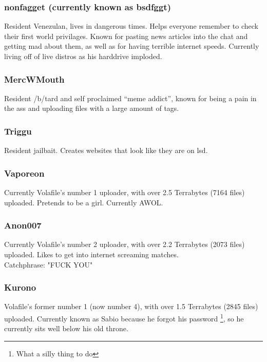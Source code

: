 \documentclass[12pt]{report}
\begin{document}
{{        \subsubsection{nonfagget (currently known as bsdfggt)}
        Resident Venezulan, lives in dangerous times. Helps everyone
        remember to check their first world privilages. Known for
        pasting news articles into the chat and getting mad about them,
        as well as for having terrible internet speeds. Currently living
        off of live distros as his harddrive imploded.

        \subsubsection{MercWMouth}
        Resident /b/tard and self proclaimed ``meme addict'', known for being
        a pain in the ass and uploading files with a large amount of tags.

        \subsubsection{Triggu}
        Resident jailbait. Creates websites that look like they are on lsd.

        \subsubsection{Vaporeon}
        Currently Volafile's number 1 uploader, with over 2.5 Terrabytes (7164 files) uploaded.
        Pretends to be a girl. Currently AWOL.

        \subsubsection{Anon007}
        Currently Volafile's number 2 uploader, with over 2.2 Terrabytes (2073 files) uploaded.
        Likes to get into internet screaming matches.\\ Catchphrase: "FUCK YOU"

        \subsubsection{Kurono}
        Volafile's former number 1 (now number 4), with over 1.5 Terrabytes (2845 files) uploaded.
        Currently known as Sabio because he forgot his password
        \footnote{What a silly thing to do},
        so he currently sits well below his old throne.

}}
\end{document}
